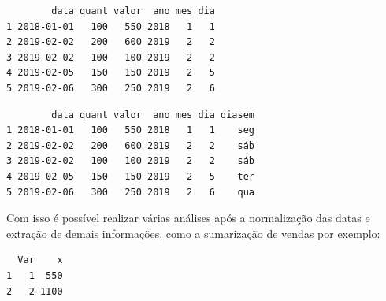 \documentclass[12pt,brazil,oneside]{book}
\newenvironment{Shaded}{\begin{snugshade}}{\end{snugshade}}
\newcommand{\CommentTok}[1]{\textcolor[rgb]{0.56,0.35,0.01}{\textit{#1}}}
\newcommand{\DataTypeTok}[1]{\textcolor[rgb]{0.13,0.29,0.53}{#1}}
\newcommand{\KeywordTok}[1]{\textcolor[rgb]{0.13,0.29,0.53}{\textbf{#1}}}
\newcommand{\NormalTok}[1]{#1}
\newcommand{\OperatorTok}[1]{\textcolor[rgb]{0.81,0.36,0.00}{\textbf{#1}}}
\newcommand{\OtherTok}[1]{\textcolor[rgb]{0.56,0.35,0.01}{#1}}
\begin{document}
\begin{verbatim}
        data quant valor  ano mes dia
1 2018-01-01   100   550 2018   1   1
2 2019-02-02   200   600 2019   2   2
3 2019-02-02   100   100 2019   2   2
4 2019-02-05   150   150 2019   2   5
5 2019-02-06   300   250 2019   2   6
\end{verbatim}

\begin{Shaded}
\end{Shaded}

\begin{verbatim}
        data quant valor  ano mes dia diasem
1 2018-01-01   100   550 2018   1   1    seg
2 2019-02-02   200   600 2019   2   2    sáb
3 2019-02-02   100   100 2019   2   2    sáb
4 2019-02-05   150   150 2019   2   5    ter
5 2019-02-06   300   250 2019   2   6    qua
\end{verbatim}

Com isso é possível realizar várias análises após a normalização das datas e extração de demais informações, como a sumarização de vendas por exemplo:

\begin{Shaded}
\end{Shaded}

\begin{verbatim}
  Var    x
1   1  550
2   2 1100
\end{verbatim}

\begin{Shaded}
\end{Shaded}
\end{document}
